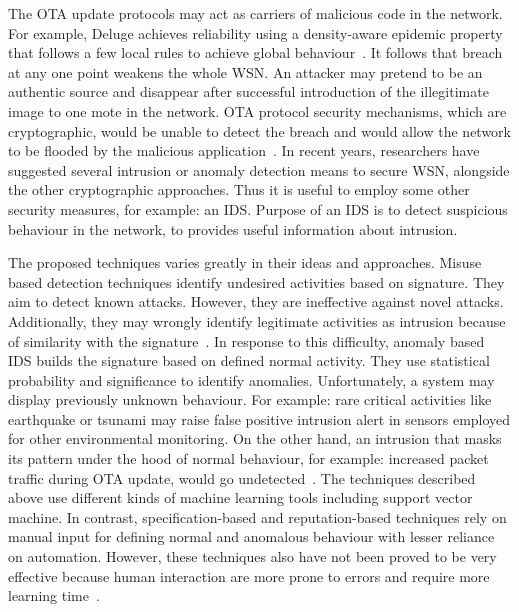 \documentclass[conference,final]{IEEEtran}
\begin{document}
The OTA update protocols may act as carriers of malicious
code in the network. For example, Deluge achieves reliability
using a density-aware epidemic property that 
follows a few local rules to achieve global
behaviour~\cite{1031506}.
It follows that breach at any one point weakens
the whole WSN. An attacker may pretend to be an authentic
source and disappear after successful introduction of the illegitimate image to one mote in the network. OTA protocol security
mechanisms, which are cryptographic, would be unable to
detect the breach and would allow the network to be flooded
by the malicious application~\cite{Karlof:2004:TLL:1031495.1031515}.
In recent years, researchers
have suggested several intrusion or anomaly detection means
to secure WSN, alongside the other cryptographic approaches.
Thus it is useful to employ some other security measures, for
example: an IDS. Purpose of an IDS is to detect suspicious
behaviour in the network, to provides useful information about
intrusion.

The proposed techniques varies greatly in their ideas and approaches.
Misuse based  detection  techniques identify undesired activities based  on signature.
They aim to detect known attacks.
However, they are ineffective against novel attacks.
Additionally, they may wrongly identify legitimate activities as intrusion because of similarity with the signature~\cite{372146, 1515559, ISI:000298891500099, Chen:2009:NMI:1516241.1516282, 1424814, Strikos_afull}.
In response to this difficulty, anomaly based IDS builds the signature based on defined normal activity.
They use statistical probability and significance to identify anomalies. Unfortunately, a system may display previously unknown behaviour.
For example: rare critical activities like earthquake or tsunami may raise false positive intrusion alert in sensors employed for other environmental monitoring.
On the other hand, an intrusion that masks its pattern under the hood of normal behaviour, for example: increased packet traffic during OTA update, would go undetected~\cite{ISI:000257882502160, 1593102, 1290173, 4024996}.
The techniques described above use different kinds of machine learning tools including support vector machine.
In contrast, specification-based and reputation-based techniques rely on manual input for defining normal and anomalous behaviour with lesser reliance on automation.
However, these techniques also have not been proved to be very effective because human interaction are more prone to errors and require more learning time~\cite{Chen:2009:NMI:1516241.1516282, 4085803, Ko2001}. 
\end{document}
